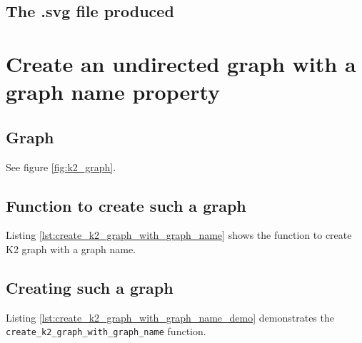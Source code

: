 \subsection{The .svg file produced}

%
%

\section{Create an undirected graph with a graph name property}
\label{subsec:create_k2_graph_with_graph_name}

\subsection{Graph}

See figure \ref{fig:k2_graph}.

\subsection{Function to create such a graph}

Listing \ref{lst:create_k2_graph_with_graph_name}
shows the function to create K2 graph with a graph name.



\subsection{Creating such a graph}

Listing \ref{lst:create_k2_graph_with_graph_name_demo}
demonstrates the \verb;create_k2_graph_with_graph_name; function.



